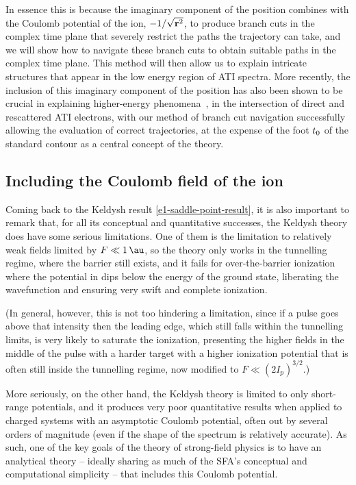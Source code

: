In essence this is because the imaginary component of the position combines with the Coulomb potential of the ion, $-1/\sqrt{\vb{r}^2}$, to produce branch cuts in the complex time plane that severely restrict the paths the trajectory can take, and we will show how to navigate these branch cuts to obtain suitable paths in the complex time plane. This method will then allow us to explain intricate structures that appear in the low energy region of ATI spectra. More recently, the inclusion of this imaginary component of the position has also been shown to be crucial in explaining higher-energy phenomena~\cite{keil_branch-cuts_2016}, in the intersection of direct and rescattered ATI electrons, with our method of branch cut navigation successfully allowing the evaluation of correct trajectories, at the expense of the foot ${t_0}$ of the standard contour as a central concept of the theory.








\subsection{Including the Coulomb field of the ion}
Coming back to the Keldysh result \eqref{e1-saddle-point-result}, it is also important to remark that, for all its conceptual and quantitative successes, the Keldysh theory does have some serious limitations. One of them is the limitation to relatively weak fields limited by $F\ll \SI{1}{\au}$, so the theory only works in the tunnelling regime, where the barrier still exists, and it fails for over-the-barrier ionization where the potential in  dips below the energy of the ground state, liberating the wavefunction and ensuring very swift and complete ionization. 

(In general, however, this is not too hindering a limitation, since if a pulse goes above that intensity then the leading edge, which still falls within the tunnelling limits, is very likely to saturate the ionization, presenting the higher fields in the middle of the pulse with a harder target with a higher ionization potential that is often still inside the tunnelling regime, now modified to $F\ll (2I_p)^{3/2}$.)


More seriously, on the other hand, the Keldysh theory is limited to only short-range potentials, and it produces very poor quantitative results when applied to charged systems with an asymptotic Coulomb potential, often out by several orders of magnitude (even if the shape of the spectrum is relatively accurate). As such, one of the key goals of the theory of strong-field physics is to have an analytical theory -- ideally sharing as much of the SFA's conceptual and computational simplicity -- that includes this Coulomb potential.


